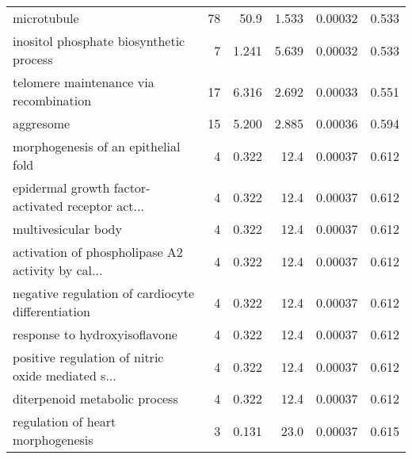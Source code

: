 \begin{longtable}{lrrrrr}
                                       microtubule &                      78 &                    50.9 &      1.533 &              0.00032 &                0.533 \\
           inositol phosphate biosynthetic process &                       7 &                   1.241 &      5.639 &              0.00032 &                0.533 \\
            telomere maintenance via recombination &                      17 &                   6.316 &      2.692 &              0.00033 &                0.551 \\
                                         aggresome &                      15 &                   5.200 &      2.885 &              0.00036 &                0.594 \\
               morphogenesis of an epithelial fold &                       4 &                   0.322 &       12.4 &              0.00037 &                0.612 \\
 epidermal growth factor-activated receptor act... &                       4 &                   0.322 &       12.4 &              0.00037 &                0.612 \\
                               multivesicular body &                       4 &                   0.322 &       12.4 &              0.00037 &                0.612 \\
 activation of phospholipase A2 activity by cal... &                       4 &                   0.322 &       12.4 &              0.00037 &                0.612 \\
 negative regulation of cardiocyte differentiation &                       4 &                   0.322 &       12.4 &              0.00037 &                0.612 \\
                     response to hydroxyisoflavone &                       4 &                   0.322 &       12.4 &              0.00037 &                0.612 \\
 positive regulation of nitric oxide mediated s... &                       4 &                   0.322 &       12.4 &              0.00037 &                0.612 \\
                     diterpenoid metabolic process &                       4 &                   0.322 &       12.4 &              0.00037 &                0.612 \\
                 regulation of heart morphogenesis &                       3 &                   0.131 &       23.0 &              0.00037 &                0.615 \\

\end{longtable}
